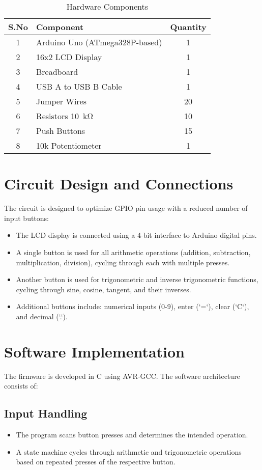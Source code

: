 \documentclass[journal]{IEEEtran}
\begin{document}
\begin{table}[h]
    \centering
    \renewcommand{\arraystretch}{1.2}
    \caption{Hardware Components}
    \label{table:hardware}
    \begin{tabular}{|c|l|c|}
        \hline
        \textbf{S.No} & \textbf{Component} & \textbf{Quantity} \\
        \hline
         1 & Arduino Uno (ATmega328P-based) & 1 \\
         2 & 16x2 LCD Display & 1  \\
         3 & Breadboard & 1 \\
         4 & USB A to USB B Cable & 1 \\
         5 & Jumper Wires & 20 \\
         6 & Resistors \SI{10}{\kilo\ohm} & 10 \\
         7 & Push Buttons & 15 \\
         8 & 10k Potentiometer & 1 \\
        \hline
    \end{tabular}
\end{table}

\section{Circuit Design and Connections}
The circuit is designed to optimize GPIO pin usage with a reduced number of input buttons:
\begin{itemize}
    \item The LCD display is connected using a 4-bit interface to Arduino digital pins.
    \item A single button is used for all arithmetic operations (addition, subtraction, multiplication, division), cycling through each with multiple presses.
    \item Another button is used for trigonometric and inverse trigonometric functions, cycling through sine, cosine, tangent, and their inverses.
    \item Additional buttons include: numerical inputs (0-9), enter (`=`), clear (`C`), and decimal (`.`).
\end{itemize}

\section{Software Implementation}
The firmware is developed in C using AVR-GCC. The software architecture consists of:
\subsection{Input Handling}
\begin{itemize}
    \item The program scans button presses and determines the intended operation.
    \item A state machine cycles through arithmetic and trigonometric operations based on repeated presses of the respective button.
\end{itemize}
\end{document}

